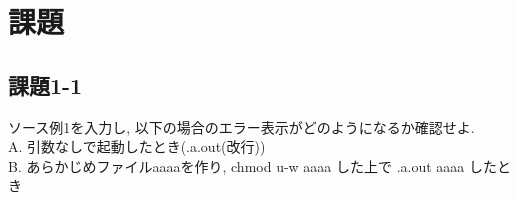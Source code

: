 \section{課題}
\subsection{課題1-1}
ソース例1を入力し, 以下の場合のエラー表示がどのようになるか確認せよ. \\
A. 引数なしで起動したとき(.\/a.out(改行)) \\
B. あらかじめファイルaaaaを作り, chmod u-w aaaa した上で .\/a.out aaaa したとき

